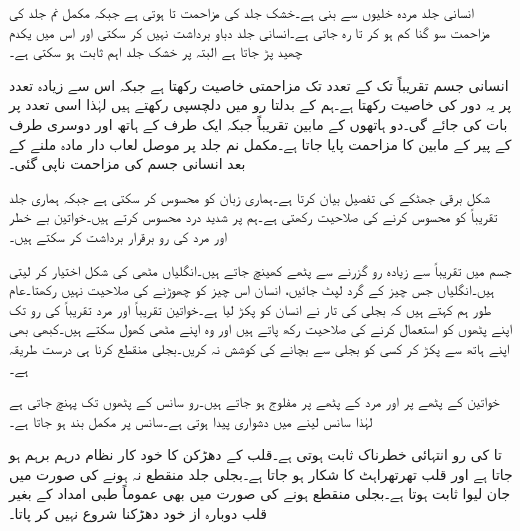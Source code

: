 انسانی جلد مردہ خلیوں سے بنی ہے۔خشک جلد کی مزاحمت  تا  ہوتی ہے جبکہ مکمل نم جلد کی مزاحمت سو گنا کم ہو کر  تا  رہ جاتی ہے۔انسانی جلد  دباو برداشت نہیں کر سکتی اور اس میں یکدم چھید پڑ جاتا ہے البتہ   پر خشک جلد اہم ثابت ہو سکتی ہے۔

انسانی جسم تقریباً  تک کے تعدد تک مزاحمتی خاصیت رکھتا ہے جبکہ اس سے زیادہ تعدد پر یہ  دور کی خاصیت رکھتا ہے۔ہم  کے بدلتا رو میں دلچسپی رکھتے ہیں لہٰذا اسی تعدد پر بات کی جائے گی۔دو ہاتھوں کے مابین تقریباً  جبکہ ایک طرف کے ہاتھ اور دوسری طرف کے پیر کے مابین  کا مزاحمت پایا جاتا ہے۔مکمل نم جلد پر موصل لعاب دار مادہ ملنے کے بعد انسانی جسم کی مزاحمت ناپی گئی۔  

شکل  برقی جھٹکے کی تفصیل بیان کرتا ہے۔ہماری زبان  کو محسوس کر سکتی ہے جبکہ ہماری جلد تقریباً  کو محسوس کرنے کی صلاحیت رکھتی ہے۔ہم  پر شدید درد محسوس کرتے ہیں۔خواتین بے خطر   اور مرد  کی رو برقرار برداشت کر سکتے ہیں۔

جسم میں تقریباً  سے زیادہ رو گزرنے سے پٹھے کھینچ جاتے ہیں۔انگلیاں مٹھی  کی شکل اختیار کر لیتی ہیں۔انگلیاں جس چیز کے گرد لپٹ جائیں، انسان اس چیز کو چھوڑنے کی صلاحیت نہیں رکھتا۔عام طور ہم کہتے ہیں کہ بجلی کی تار نے انسان کو پکڑ لیا ہے۔خواتین تقریباً  اور مرد تقریباً  کی رو تک اپنے پٹھوں کو استعمال کرنے کی صلاحیت رکھ پاتے ہیں اور وہ اپنے مٹھی کھول سکتے ہیں۔کبھی بھی اپنے  ہاتھ سے پکڑ کر کسی کو بجلی سے بچانے کی کوشش نہ کریں۔بجلی منقطع کرنا ہی درست طریقہ ہے۔

خواتین کے پٹھے  پر اور مرد کے پٹھے  پر مفلوج ہو جاتے ہیں۔رو سانس کے پٹھوں تک پہنچ جاتی ہے لہٰذا سانس لینے میں دشواری پیدا ہوتی ہے۔سانس  پر مکمل بند ہو جاتا ہے۔

 تا  کی رو انتہائی خطرناک ثابت ہوتی ہے۔قلب کے دھڑکن کا خود کار نظام درہم برہم ہو جاتا ہے اور قلب تھرتھراہٹ کا شکار ہو جاتا ہے۔بجلی جلد منقطع نہ ہونے کی صورت میں جان لیوا ثابت ہوتا ہے۔بجلی منقطع ہونے کی صورت میں بھی عموماً طبی امداد کے بغیر قلب دوبارہ از خود دھڑکنا شروع نہیں کر پاتا۔

